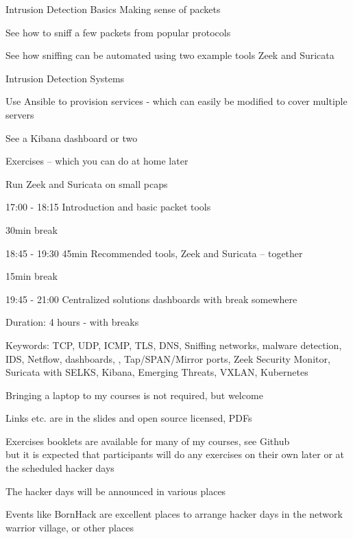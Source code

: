\documentclass[Screen16to9,17pt]{foils}
\begin{document}
\mytitlepage
{Intrusion Detection Basics}
{Making sense of packets}

\hlkprofiluk





\begin{list1}
\item See how to sniff a few packets from popular protocols
\item See how sniffing can be automated using two example tools Zeek and Suricata
\item Intrusion Detection Systems
\item Use Ansible to provision services - which can easily be modified to cover multiple servers
\item See a Kibana dashboard or two
\item Exercises -- which you can do at home later
\begin{list2}
\item Run Zeek and Suricata on small pcaps
\end{list2}
\end{list1}


\begin{list2}
\item 17:00 - 18:15 Introduction and basic packet tools
\item 30min break
\item 18:45 - 19:30 45min Recommended tools, Zeek and Suricata -- together
\item  15min break
\item 19:45 - 21:00 Centralized solutions dashboards with break somewhere
\end{list2}


Duration: 4 hours - with breaks

Keywords:
TCP, UDP, ICMP, TLS, DNS, Sniffing networks, malware detection, IDS, Netflow, dashboards, , Tap/SPAN/Mirror ports, Zeek Security Monitor, Suricata with SELKS, Kibana, Emerging Threats, VXLAN, Kubernetes




\begin{list2}
\item Bringing a laptop to my courses is not required, but welcome
\item Links etc. are in the slides and open source licensed, PDFs
\item Exercises booklets are available for many of my courses, see Github\\
but it is expected that participants will do any exercises on their own later or at the scheduled hacker days
\item The hacker days will be announced in various places

\item Events like BornHack are excellent places to arrange hacker days in the network warrior village, or other places
\end{list2}
\end{document}
